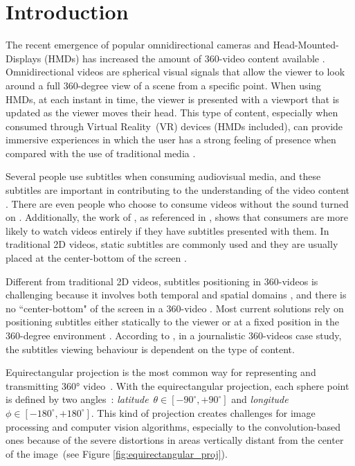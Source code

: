 \section{Introduction}

The recent emergence of popular omnidirectional cameras and Head-Mounted-Displays (HMDs) has increased the amount of 360-video content available \cite{mendes_2020}. Omnidirectional videos are spherical visual signals that allow the viewer to look around a full 360-degree view of a scene from a specific point. When using HMDs, at each instant in time, the viewer is presented with a viewport that is updated as the viewer moves their head. This type of content, especially when consumed through Virtual Reality~(VR) devices (HMDs included), can provide immersive experiences in which the user has a strong feeling of presence when compared with the use of traditional media \cite{montagud_culture_2020}.

Several people use subtitles when consuming audiovisual media, and these subtitles are important in contributing to the understanding of the video content \cite{brown_subtitles_2017}. There are even people who choose to consume videos without the sound turned on \cite{hughes_disruptive_2019}. Additionally, the work of \cite{hayati2011effect}, as referenced in \cite{hughes_disruptive_2019}, shows that consumers are more likely to watch videos entirely if they have subtitles presented with them. In traditional 2D videos, static subtitles are commonly used and they are usually placed at the center-bottom of the screen \cite{rothe_dynamic_2018}.

Different from traditional 2D videos, subtitles positioning in 360-videos is challenging because it involves both temporal and spatial domains \cite{agullo2019making}, and there is no ``center-bottom" of the screen in a 360-video \cite{brown_subtitles_2017}. Most current solutions rely on positioning subtitles either statically to the viewer or at a fixed position in the 360-degree environment \cite{mendes_2020}. According to \cite{li_impacts_2018}, in a journalistic 360-videos case study, the subtitles viewing behaviour is dependent on the type of content. 

Equirectangular projection is the most common way for representing and transmitting 360° video~\cite{yang2018object}. With the equirectangular projection, each sphere point is defined by two angles~\cite{snyder1987map}: \emph{latitude}~$\theta \in [-90^{\circ}, +90^{\circ}]$ and \emph{longitude}~$\phi \in [-180^{\circ}, +180^{\circ}]$. This kind of projection creates challenges for image processing and computer vision algorithms, especially to the convolution-based ones because of the severe distortions in areas vertically distant from the center of the image~(see Figure \ref{fig:equirectangular_proj}).

